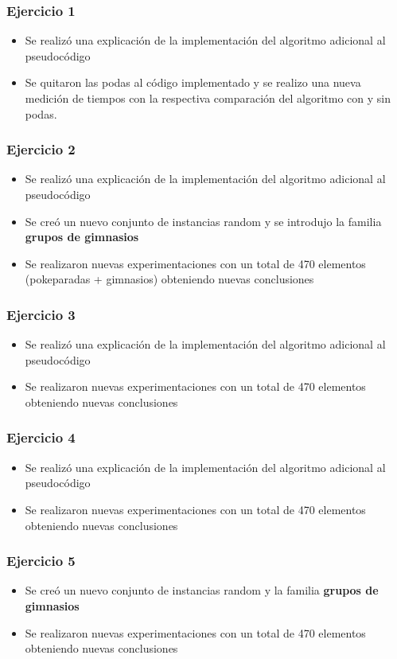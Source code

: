 \subsubsection{Ejercicio 1}
\begin{itemize}
\item Se realiz\'o una explicaci\'on de la implementaci\'on del algoritmo adicional al pseudoc\'odigo
\item Se quitaron las podas al c\'odigo implementado y se realizo una nueva medici\'on de tiempos con la respectiva comparaci\'on del algoritmo con y sin podas.
\end{itemize}

\subsubsection{Ejercicio 2}
\begin{itemize}
\item Se realiz\'o una explicaci\'on de la implementaci\'on del algoritmo adicional al pseudoc\'odigo
\item Se creó un nuevo conjunto de instancias random y se introdujo la familia \textbf{grupos de gimnasios}
\item Se realizaron nuevas experimentaciones con un total de 470 elementos (pokeparadas + gimnasios) obteniendo nuevas conclusiones
\end{itemize}

\subsubsection{Ejercicio 3}
\begin{itemize}
\item Se realiz\'o una explicaci\'on de la implementaci\'on del algoritmo adicional al pseudoc\'odigo
\item Se realizaron nuevas experimentaciones con un total de 470 elementos obteniendo nuevas conclusiones
\end{itemize}

\subsubsection{Ejercicio 4}
\begin{itemize}
\item Se realiz\'o una explicaci\'on de la implementaci\'on del algoritmo adicional al pseudoc\'odigo
\item Se realizaron nuevas experimentaciones con un total de 470 elementos obteniendo nuevas conclusiones
\end{itemize}

\subsubsection{Ejercicio 5}
\begin{itemize}
\item Se creó un nuevo conjunto de instancias random y la familia \textbf{grupos de gimnasios}
\item Se realizaron nuevas experimentaciones con un total de 470 elementos obteniendo nuevas conclusiones
\end{itemize}